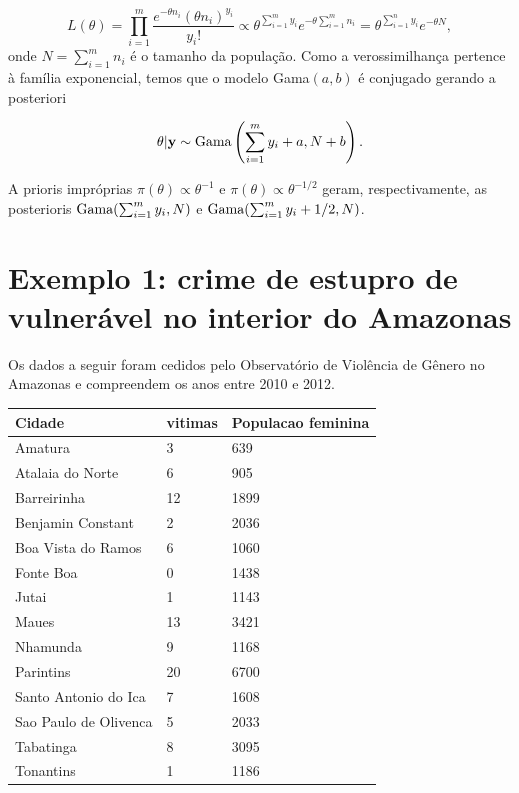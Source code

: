 \documentclass[
  letterpaper,
  DIV=11,
  numbers=noendperiod]{scrreprt}
\theoremstyle{definition}
\theoremstyle{definition}
\theoremstyle{remark}
\begin{document}
\[L(\theta)=\prod_{i=1}^m\frac{e^{-\theta n_i}(\theta n_i)^{y_i}}{y_i!}\varpropto \theta^{\sum_{i=1}^m y_i}e^{-\theta \sum_{i=1}^m n_i}=\theta^{\sum_{i=1}^n y_i}e^{-\theta N},\]
onde \(N=\sum_{i=1}^m n_i\) é o tamanho da população. Como a
verossimilhança pertence à família exponencial, temos que o modelo
Gama\((a,b)\) é conjugado gerando a posteriori

\[\theta|\mathbf{y}\sim\hbox{Gama}\left(\sum_{i=1}^{m}y_i+a,N+b\right).\]

A prioris impróprias \(\pi(\theta)\varpropto \theta^{-1}\) e
\(\pi(\theta)\varpropto \theta^{-1/2}\) geram, respectivamente, as
posterioris \(\hbox{Gama}(\sum_{i=1}^m y_i,N)\) e
\(\hbox{Gama}(\sum_{i=1}^m y_i+1/2,N)\).

\hypertarget{exemplo-1-crime-de-estupro-de-vulneruxe1vel-no-interior-do-amazonas}{%
\section{Exemplo 1: crime de estupro de vulnerável no interior do
Amazonas}\label{exemplo-1-crime-de-estupro-de-vulneruxe1vel-no-interior-do-amazonas}}

Os dados a seguir foram cedidos pelo Observatório de Violência de Gênero
no Amazonas e compreendem os anos entre 2010 e 2012.

\begin{longtable}[]{@{}lll@{}}
\toprule\noalign{}
Cidade & vitimas & Populacao feminina \\
\midrule\noalign{}
\endhead
\bottomrule\noalign{}
\endlastfoot
Amatura & 3 & 639 \\
Atalaia do Norte & 6 & 905 \\
Barreirinha & 12 & 1899 \\
Benjamin Constant & 2 & 2036 \\
Boa Vista do Ramos & 6 & 1060 \\
Fonte Boa & 0 & 1438 \\
Jutai & 1 & 1143 \\
Maues & 13 & 3421 \\
Nhamunda & 9 & 1168 \\
Parintins & 20 & 6700 \\
Santo Antonio do Ica & 7 & 1608 \\
Sao Paulo de Olivenca & 5 & 2033 \\
Tabatinga & 8 & 3095 \\
Tonantins & 1 & 1186 \\
\end{longtable}
\end{document}
